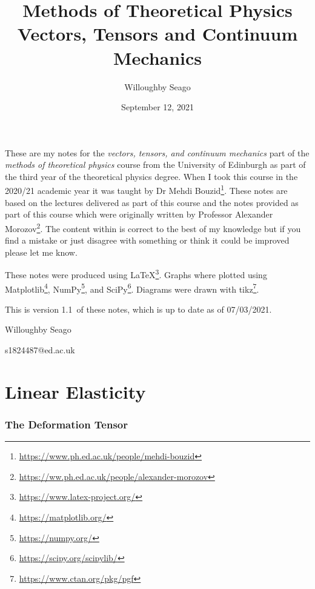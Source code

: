 \documentclass[a4paper]{article}
\author{Willoughby Seago}
\date{September 12, 2021}
\title{
    Methods of Theoretical Physics\\
    {\Large Vectors, Tensors and Continuum Mechanics}
}
\newcommand{\notesVersion}{1.1}
\newcommand{\notesDate}{07/03/2021}
\begin{document}
    \maketitle
    These are my notes for the \textit{vectors, tensors, and continuum mechanics} part of the \textit{methods of theoretical physics} course from the University of Edinburgh as part of the third year of the theoretical physics degree.
    When I took this course in the 2020/21 academic year it was taught by Dr Mehdi Bouzid\footnote{\url{https://www.ph.ed.ac.uk/people/mehdi-bouzid}}.
    These notes are based on the lectures delivered as part of this course and the notes provided as part of this course which were originally written by Professor Alexander Morozov\footnote{\url{https://ww.ph.ed.ac.uk/people/alexander-morozov}}.
    The content within is correct to the best of my knowledge but if you find a mistake or just disagree with something or think it could be improved please let me know.
    
    These notes were produced using \LaTeX\footnote{\url{https://www.latex-project.org/}}.
    Graphs where plotted using Matplotlib\footnote{\url{https://matplotlib.org/}}, NumPy\footnote{\url{https://numpy.org/}}, and SciPy\footnote{\url{https://scipy.org/scipylib/}}.
    Diagrams were drawn with tikz\footnote{\url{https://www.ctan.org/pkg/pgf}}.
    
    This is version \notesVersion~of these notes, which is up to date as of \notesDate.
    \begin{flushright}
        Willoughby Seago
        
        s1824487@ed.ac.uk
    \end{flushright}
    \clearpage
    \tableofcontents
    \printglossary[type=\acronymtype, title=Acronyms]
    \clearpage
    \begingroup
    \let\clearpage\relax  %
    
    \endgroup
    
    
    \part{Linear Elasticity}
    \section{The Deformation Tensor}
\end{document}
